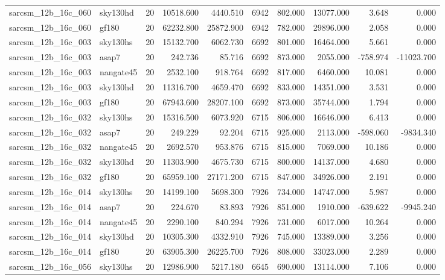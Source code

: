 \begin{tabular}{llrrrrrrrr}
sarcsm\_12b\_16c\_060 & sky130hd & 20 & 10518.600 & 4440.510 & 6942 & 802.000 & 13077.000 & 3.648 & 0.000 \\
sarcsm\_12b\_16c\_060 & gf180 & 20 & 62232.800 & 25872.900 & 6942 & 782.000 & 29896.000 & 2.058 & 0.000 \\
sarcsm\_12b\_16c\_003 & sky130hs & 20 & 15132.700 & 6062.730 & 6692 & 801.000 & 16464.000 & 5.661 & 0.000 \\
sarcsm\_12b\_16c\_003 & asap7 & 20 & 242.736 & 85.716 & 6692 & 873.000 & 2055.000 & -758.974 & -11023.700 \\
sarcsm\_12b\_16c\_003 & nangate45 & 20 & 2532.100 & 918.764 & 6692 & 817.000 & 6460.000 & 10.081 & 0.000 \\
sarcsm\_12b\_16c\_003 & sky130hd & 20 & 11316.700 & 4659.470 & 6692 & 833.000 & 14351.000 & 3.531 & 0.000 \\
sarcsm\_12b\_16c\_003 & gf180 & 20 & 67943.600 & 28207.100 & 6692 & 873.000 & 35744.000 & 1.794 & 0.000 \\
sarcsm\_12b\_16c\_032 & sky130hs & 20 & 15316.500 & 6073.920 & 6715 & 806.000 & 16646.000 & 6.413 & 0.000 \\
sarcsm\_12b\_16c\_032 & asap7 & 20 & 249.229 & 92.204 & 6715 & 925.000 & 2113.000 & -598.060 & -9834.340 \\
sarcsm\_12b\_16c\_032 & nangate45 & 20 & 2692.570 & 953.876 & 6715 & 815.000 & 7069.000 & 10.186 & 0.000 \\
sarcsm\_12b\_16c\_032 & sky130hd & 20 & 11303.900 & 4675.730 & 6715 & 800.000 & 14137.000 & 4.680 & 0.000 \\
sarcsm\_12b\_16c\_032 & gf180 & 20 & 65959.100 & 27171.200 & 6715 & 847.000 & 34926.000 & 2.191 & 0.000 \\
sarcsm\_12b\_16c\_014 & sky130hs & 20 & 14199.100 & 5698.300 & 7926 & 734.000 & 14747.000 & 5.987 & 0.000 \\
sarcsm\_12b\_16c\_014 & asap7 & 20 & 224.670 & 83.893 & 7926 & 851.000 & 1910.000 & -639.622 & -9945.240 \\
sarcsm\_12b\_16c\_014 & nangate45 & 20 & 2290.100 & 840.294 & 7926 & 731.000 & 6017.000 & 10.264 & 0.000 \\
sarcsm\_12b\_16c\_014 & sky130hd & 20 & 10305.300 & 4332.910 & 7926 & 745.000 & 13389.000 & 3.256 & 0.000 \\
sarcsm\_12b\_16c\_014 & gf180 & 20 & 63905.300 & 26225.700 & 7926 & 808.000 & 33023.000 & 2.289 & 0.000 \\
sarcsm\_12b\_16c\_056 & sky130hs & 20 & 12986.900 & 5217.180 & 6645 & 690.000 & 13114.000 & 7.106 & 0.000 \\

\end{tabular}
